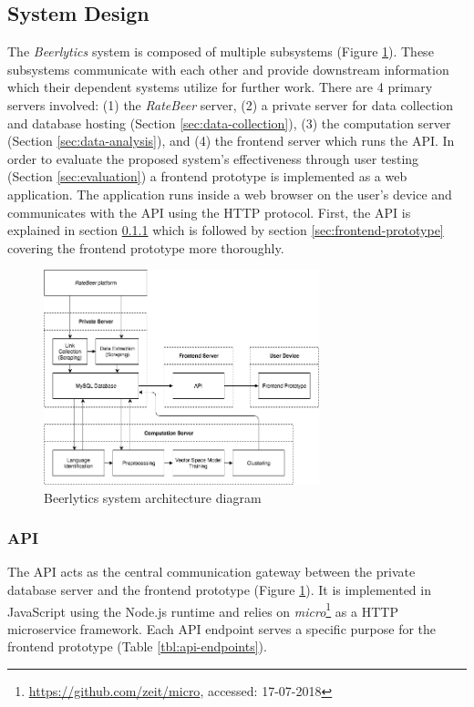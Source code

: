 \subsection{System Design} \label{sec:system-design}
The \textit{Beerlytics} system is composed of multiple subsystems (Figure \ref{fig:architecture}).
These subsystems communicate with each other and provide downstream information which their dependent systems utilize for further work.
There are 4 primary servers involved: (1) the \textit{RateBeer} server, (2) a private server for data collection and database hosting (Section \ref{sec:data-collection}), (3) the computation server (Section \ref{sec:data-analysis}), and (4) the frontend server which runs the API.
In order to evaluate the proposed system's effectiveness through user testing (Section \ref{sec:evaluation}) a frontend prototype is implemented as a web application.
The application runs inside a web browser on the user's device and communicates with the API using the HTTP protocol.
First, the API is explained in section \ref{sec:api} which is followed by section \ref{sec:frontend-prototype} covering the frontend prototype more thoroughly. 

\begin{figure}[h]
\includegraphics[width=8cm]{assets/architecture.png}
\caption{Beerlytics system architecture diagram}
\centering
\label{fig:architecture}
\end{figure}

\subsubsection{API} \label{sec:api}
The API acts as the central communication gateway between the private database server and the frontend prototype (Figure \ref{fig:architecture}).
It is implemented in JavaScript using the Node.js \cite{Tilkov2010} runtime and relies on \textit{micro}\footnote{\url{https://github.com/zeit/micro}, accessed: 17-07-2018} as a HTTP microservice framework. 
Each API endpoint serves a specific purpose for the frontend prototype (Table \ref{tbl:api-endpoints}).

